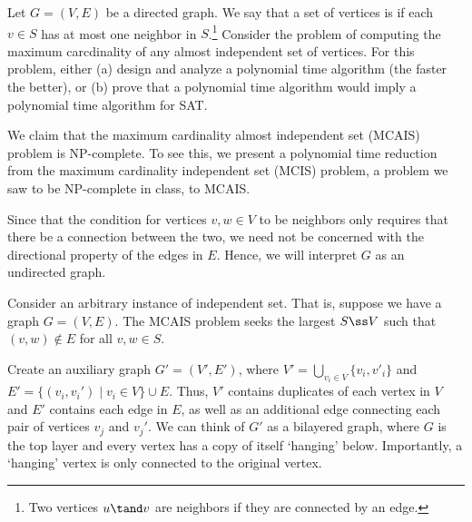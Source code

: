 \documentclass{article}
\begin{document}
\setcounter{section}{13}
\setcounter{exercise}{3}
\begin{exercise}
Let $ G=(V,E) $ be a directed graph.
We say that a set of vertices is  if each $ v\in S $ has at most one neighbor in $ S $.\footnote[5]{Two vertices $u \tand v$ are neighbors if they are connected by an edge.}
Consider the problem of computing the maximum carcdinality of any almost independent set of vertices.
For this problem, either (a) design and analyze a polynomial time algorithm (the faster the better), or (b) prove that a polynomial time algorithm would imply a polynomial time algorithm for SAT.
\end{exercise}

\begin{solution}
  We claim that the maximum cardinality almost independent set (MCAIS) problem is NP-complete.
  To see this, we present a polynomial time reduction from the maximum cardinality independent set (MCIS) problem, a problem we saw to be NP-complete in class, to MCAIS.

  \begin{note}
    Since that the condition for vertices $ v,w\in V $ to be neighbors only requires that there be a connection between the two, we need not be concerned with the directional property of the edges in $ E $.
    Hence, we will interpret $ G $ as an undirected graph.
  \end{note}

  Consider an arbitrary instance of independent set.
  That is, suppose we have a graph $ G=(V,E) $.
  The MCAIS problem seeks the largest $ S\ss V $ such that $ (v,w)\not\in E $ for all $ v,w\in S $.

  Create an auxiliary graph $ G'=(V',E') $, where $ V'=\bigcup\limits_{v_i\in V}\{v_i,v'_i\} $ and $ E'=\{(v_i,v_i')\mid v_i\in V\}\cup E $.
  Thus, $ V' $ contains duplicates of each vertex in $ V $ and $ E' $ contains each edge in $ E $, as well as an additional edge connecting each pair of vertices $ v_j $ and $ v_j' $.
  We can think of $ G' $ as a bilayered graph, where $ G $ is the top layer and every vertex has a copy of itself `hanging' below.
  Importantly, a `hanging' vertex is only connected to the original vertex.


\end{solution}
\end{document}
